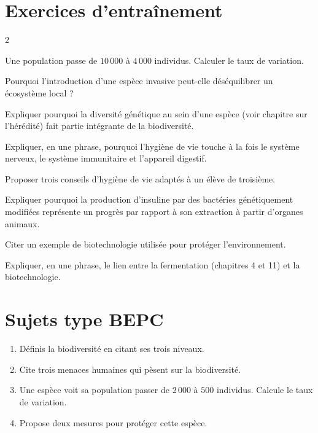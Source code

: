 \section{Exercices d'entraînement}
\begin{multicols}{2}

\exo{} Une population passe de $10\,000$ à $4\,000$ individus. Calculer le taux
de variation.

\exo{} Pourquoi l'introduction d'une espèce invasive peut-elle déséquilibrer un
écosystème local ?

\exo{} Expliquer pourquoi la diversité génétique au sein d'une espèce (voir
chapitre sur l'hérédité) fait partie intégrante de la biodiversité.

\exo{} Expliquer, en une phrase, pourquoi l'hygiène de vie touche à la fois le
système nerveux, le système immunitaire et l'appareil digestif.

\exo{} Proposer trois conseils d'hygiène de vie adaptés à un élève de troisième.

\exo{} Expliquer pourquoi la production d'insuline par des bactéries
génétiquement modifiées représente un progrès par rapport à son extraction à partir
d'organes animaux.

\exo{} Citer un exemple de biotechnologie utilisée pour protéger
l'environnement.

\exo{} Expliquer, en une phrase, le lien entre la fermentation (chapitres 4 et
11) et la biotechnologie.

\end{multicols}

\section{Sujets type BEPC}

\begin{enumerate}[label=\arabic*)]
\item Définis la biodiversité en citant ses trois niveaux.
\item Cite trois menaces humaines qui pèsent sur la biodiversité.
\item Une espèce voit sa population passer de $2\,000$ à $500$ individus. Calcule le
taux de variation.
\item Propose deux mesures pour protéger cette espèce.
\end{enumerate}

